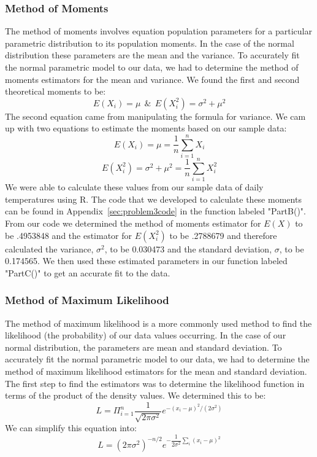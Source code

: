 \documentclass[11pt]{article}
\begin{document}
\subsubsection{Method of Moments}
\label{subsubsec:methodofmoments}
The method of moments involves equation population parameters for a particular parametric distribution to its population moments. In the case of the normal distribution these parameters are the mean and the variance. To accurately fit the normal parametric model to our data, we had to determine the method of moments estimators for the mean and variance. We found the first and second theoretical moments to be: 
\begin{equation}
E(X_i) = \mu\ \ \&\ \ E(X_i^2) = \sigma ^ 2 + \mu ^ 2
\end{equation}
The second equation came from manipulating the formula for variance. We cam up with two equations to estimate the moments based on our sample data:
\begin{equation}
E(X_i) = \mu = \frac{1}{n} \sum_{i=1}^n X_i
\end{equation}
\begin{equation}
E(X_i^2) = \sigma ^ 2 + \mu ^ 2 = \frac{1}{n} \sum_{i=1}^{n} X_i^2
\end{equation}
We were able to calculate these values from our sample data of daily temperatures using R. The code that we developed to calculate these moments can be found in Appendix~\ref{sec:problem3code} in the function labeled "PartB()". From our code we determined the method of moments estimator for $E(X)$ to be .4953848 and the estimator for $E(X_i^2)$ to be .2788679 and therefore calculated the variance, $\sigma^2$, to be 0.030473 and the standard deviation, $\sigma$, to be 0.174565. We then used these estimated parameters in our function labeled "PartC()" to get an accurate fit to the data.
 
\subsubsection{Method of Maximum Likelihood}
\label{subsubsec:maximumlikelihood}
The method of maximum likelihood is a more commonly used method to find the likelihood (the probability) of our data values occurring. In the case of our normal distribution, the parameters are mean and standard deviation. To accurately fit the normal parametric model to our data, we had to determine the method of maximum likelihood estimators for the mean and standard deviation. The first step to find the estimators was to determine the likelihood function in terms of the product of the density values. We determined this to be:
\begin{equation}
L=\Pi_{i=1}^{n}\dfrac{1}{\sqrt{2\pi\sigma^2}}e^{-(x_i-\mu)^2/(2\sigma^2)}
\end{equation}
We can simplify this equation into:
\begin{equation}
L=(2\pi\sigma^2)^{-n/2}e^{-\dfrac{1}{2\sigma^2}\sum_{i}(x_i-\mu)^2}
\end{equation}
\end{document}
